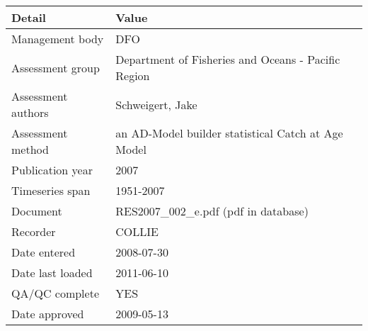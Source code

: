 \begin{table}[htb]
\centering
\begin{tabular}{lp{7cm}}
\toprule
Detail & Value \\
\midrule
Management body    & DFO                                                 \\
Assessment group   & Department of Fisheries and Oceans - Pacific Region \\
Assessment authors & Schweigert, Jake                                    \\
Assessment method  & an AD-Model builder statistical Catch at Age Model  \\
Publication year   & 2007                                                \\
Timeseries span    & 1951-2007                                           \\
Document           & RES2007\_002\_e.pdf (pdf in database)               \\
Recorder           & COLLIE                                              \\
Date entered       & 2008-07-30                                          \\
Date last loaded   & 2011-06-10                                          \\
QA/QC complete     & YES                                                 \\
Date approved      & 2009-05-13                                          \\
\bottomrule
\end{tabular}
\label{tab:assessdet}
\end{table}
